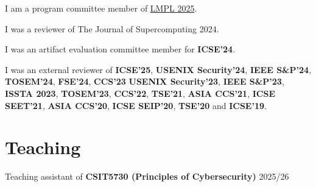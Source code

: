  






I am a program committee member of \href{https://conf.researchr.org/home/icfp-splash-2025/lmpl-2025}{LMPL 2025}.

I was a reviewer of The Journal of Supercomputing 2024.

I was an artifact evaluation committee member for \textbf{ICSE'24}.

I was an external reviewer of \textbf{ICSE'25}, \textbf{USENIX Security'24}, \textbf{IEEE S\&P'24}, \textbf{TOSEM'24}, \textbf{FSE'24}, \textbf{CCS'23} \textbf{USENIX Security'23}, \textbf{IEEE S\&P'23}, \textbf{ISSTA 2023}, \textbf{TOSEM'23}, \textbf{CCS'22}, \textbf{TSE'21}, \textbf{ASIA CCS'21}, \textbf{ICSE SEET'21}, \textbf{ASIA CCS'20}, \textbf{ICSE SEIP'20}, \textbf{TSE'20} and \textbf{ICSE'19}.

\section{Teaching}
Teaching assistant of \textbf{CSIT5730 (Principles of Cybersecurity)} \hfill 2025/26

